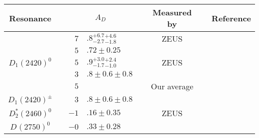 {\setlength\tabcolsep{0pt}
	\begin{tabular}{cp{5pt}r@{}lp{5pt}cp{5pt}c}
		\toprule
		\rowcolor{Gray} Resonance &&\multicolumn{2}{c}{$A_{D}$} &&  \multicolumn{1}{c}{Measured by} &&  \multicolumn{1}{c}{Reference}
		\\ \midrule
		\multirow{5}{*}{$D_{1}^{}(2420)^{0}$}   &   & $7$                        & $.8_{-2.7}^{+6.7}{}_{-1.8}^{+4.6}$    &                       & ZEUS                           &                       & \cite{Abramowicz:2012ys}    \\
		                                        &   & $ 5$                       & $.72\pm0.25$                          &                       & \babar{}                       &                       & \cite{delAmoSanchez:2010vq} \\  
		                                        &   & $ 5$                       & $.9_{-1.7}^{+3.0}{}_{-1.0}^{+2.4}$    &                       & ZEUS                           &                       & \cite{Chekanov:2008ac}      \\  
		                                        &   & $ 3$                       & $.8\pm0.6\pm0.8$                      &                       & \babar{}                       &                       & \cite{Aubert:2008zc}        \\  \cmidrule{3-7}
		                                        &   & \cellcolor{Gray}$5$        & \cellcolor{Gray}{$.61 \pm 0.24$}      & \cellcolor{Gray}      & \cellcolor{Gray}  Our average  & \cellcolor{Gray}      &                             \\ \midrule
		\multirow{1}{*}{$D_{1}^{}(2420)^{\pm}$} &   & \cellcolor{LightGray}  $3$ & \cellcolor{LightGray}$.8\pm0.6\pm0.8$ & \cellcolor{LightGray} & \cellcolor{LightGray} \babar{} & \cellcolor{LightGray} & \cite{Aubert:2008zc}        \\	\midrule		
		\multirow{1}{*}{$D_{2}^{*}(2460)^{0}$}  &   & \cellcolor{LightGray} $-1$ & \cellcolor{LightGray}$.16\pm0.35$     & \cellcolor{LightGray} & \cellcolor{LightGray} ZEUS     & \cellcolor{LightGray} & \cite{Abramowicz:2012ys}    \\	\midrule
		\multirow{1}{*}{$D_{}^{}(2750)^{0}$}    &   & \cellcolor{LightGray} $-0$ & \cellcolor{LightGray}$.33\pm0.28$     & \cellcolor{LightGray} & \cellcolor{LightGray} \babar{} & \cellcolor{LightGray} & \cite{delAmoSanchez:2010vq} \\						
		\bottomrule
	\end{tabular}}
